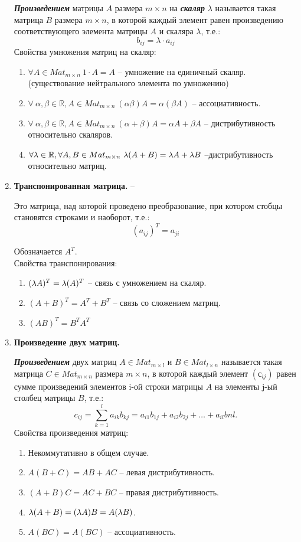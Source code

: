 \begin{enumerate}
	\textit{\textbf{Произведением}} матрицы $A$ размера $m \times n$ на \textit{\textbf{скаляр}} $\lambda$ называется такая матрица $B$ размера $m \times n$, в которой каждый элемент равен произведению соответствующего элемента матрицы $A$ и скаляра $\lambda$, т.е.:
	\[
	b_{ij} = \lambda \cdot a_{ij}
	\]
	Свойства умножения матриц на скаляр:
	\begin{enumerate}
		\item $\forall A \in Mat_{m\times n}\ 1 \cdot A = A$ -- умножение на единичный скаляр.(существование нейтрального элемента по умножению)
		\item $\forall\ \alpha, \beta \in \mathbb{R}, A \in Mat_{m\times n}\ (\alpha\beta)A= \alpha(\beta A)$ -- ассоциативность.
		\item $\forall\ \alpha, \beta \in \mathbb{R}, A \in Mat_{m\times n}\ (\alpha+\beta)A= \alpha A + \beta A$ -- дистрибутивность относительно скаляров.
		\item $\forall \lambda \in \mathbb{R}, \forall A, B \in Mat_{m\times n}\ \lambda(A+B) = \lambda A + \lambda B$ --дистрибутивность относительно матриц.
	\end{enumerate}
	
	\item \textbf{Транспонированная матрица.} --
	
	Это матрица, над которой проведено преобразование, при котором стобцы становятся строками и наоборот, т.е.: 
	\[
		(a_{ij})^T = a_{ji}
	\]
	
	Обозначается $A^T$.\\
	Свойства транспонирования:
	\begin{enumerate}
		\item $(\lambda A)^T = \lambda(A)^T$ -- связь с умножением на скаляр.
		\item $(A + B)^T = A^T + B^T$ -- связь со сложением матриц.
		\item $(AB)^T = B^T A^T$
	\end{enumerate}
	
	\item \textbf{Произведение двух матриц.}
	
	\textit{\textbf{Произведением}} двух матриц $A \in Mat_{m \times l}$ и $B \in Mat_{l \times n}$ называется такая матрица $C \in Mat_{m \times n}$ размера $m \times n$, в которой каждый элемент $(с_{ij})$ равен сумме произведений элементов i-ой строки матрицы $A$ на элементы j-ый столбец матрицы $B$, т.е.:
	\[
		c_{ij} = \sum_{k=1}^{l} a_{ik}b_{kj} = a_{i1}b_{1j} + a_{i2}b_{2j} + \ldots + a_{il}b{nl}.
	\]
	Свойства произведения матриц:
	\begin{enumerate}
		\item Некоммутативно в общем случае.
		\item $A(B+C) = AB + AC$ -- левая дистрибутивность.
		\item $(A+B)C = AC+BC$ -- правая дистрибутивность.
		\item $\lambda (A+B) = (\lambda A)B = A (\lambda B)$.
		\item $A(BC) = A(BC)$ -- ассоциативность.
	\end{enumerate}
	

\end{enumerate}
